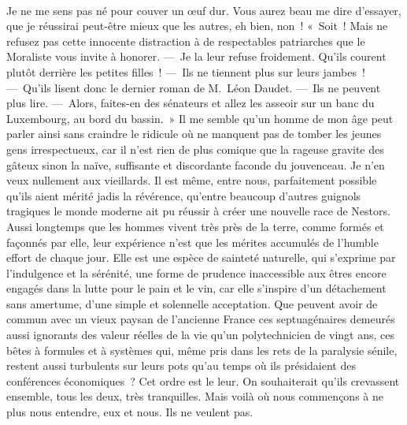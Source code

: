 \documentclass[french,twoside]{book} %
\begin{document}
\noindent  \par
Je ne me sens pas né pour couver un œuf dur. Vous aurez beau me dire d’essayer, que je réussirai peut-être mieux que les autres, eh bien, non ! « Soit ! Mais ne refusez pas cette innocente distraction à de respectables patriarches que le Moraliste vous invite à honorer. — Je la leur refuse froidement. Qu’ils courent plutôt derrière les petites filles ! — Ils ne tiennent plus sur leurs jambes ! — Qu’ils lisent donc le dernier roman de M. Léon Daudet. — Ils ne peuvent plus lire. — Alors, faites-en des sénateurs et allez les asseoir sur un banc du Luxembourg, au bord du bassin. » Il me semble qu’un homme de mon âge peut parler ainsi sans craindre le ridicule où ne manquent pas de tomber les jeunes gens irrespectueux, car il n’est rien de plus comique que la rageuse gravite des gâteux sinon la naïve, suffisante et discordante faconde du jouvenceau. Je n’en veux nullement aux vieillards. Il est même, entre nous, parfaitement possible qu’ils aient mérité jadis la révérence, qu’entre beaucoup d’autres guignols tragiques le monde moderne ait pu réussir à créer une nouvelle race de Nestors. Aussi longtemps que les hommes vivent très près de la terre, comme formés et façonnés par elle, leur expérience n’est que les mérites accumulés de l’humble effort de chaque jour. Elle est une espèce de sainteté naturelle, qui s’exprime par l’indulgence et la sérénité, une forme de prudence inaccessible aux êtres encore engagés dans la lutte pour le pain et le vin, car elle s’inspire d’un détachement sans amertume, d’une simple et solennelle acceptation. Que peuvent avoir de commun avec un vieux paysan de l’ancienne France ces septuagénaires demeurés aussi ignorants des valeur réelles de la vie qu’un polytechnicien de vingt ans, ces bêtes à formules et à systèmes qui, même pris dans les rets de la paralysie sénile, restent aussi turbulents sur leurs pots qu’au temps où ils présidaient des conférences économiques ? Cet ordre est le leur. On souhaiterait qu’ils crevassent ensemble, tous les deux, très tranquilles. Mais voilà où nous commençons à ne plus nous entendre, eux et nous. Ils ne veulent pas.\par
\end{document}
